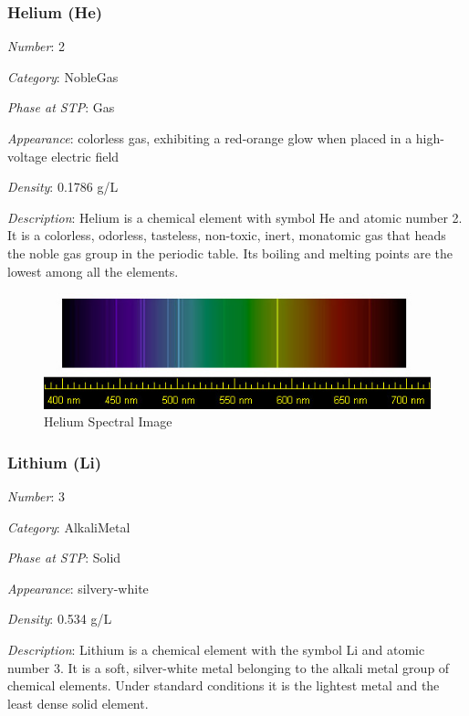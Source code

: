 \documentclass{article}
\begin{document}
\hypertarget{subsubsection::He}{}\subsubsection{Helium (He)}

\textit{Number}: 2

\textit{Category}: NobleGas

\textit{Phase at STP}: Gas

\textit{Appearance}: colorless gas, exhibiting a red-orange glow when placed in a high-voltage electric field

\textit{Density}: 0.1786 g/L

\textit{Description}: Helium is a chemical element with symbol He and atomic number 2. It is a colorless, odorless, tasteless, non-toxic, inert, monatomic gas that heads the noble gas group in the periodic table. Its boiling and melting points are the lowest among all the elements.

\immediate{}
\begin{figure}[!ht]
    \centering
    \includegraphics[width=12cm]{./resources/spectral_img/Helium_spectrum.jpg}
    \caption{Helium Spectral Image}
\end{figure}

\hypertarget{subsubsection::Li}{}\subsubsection{Lithium (Li)}

\textit{Number}: 3

\textit{Category}: AlkaliMetal

\textit{Phase at STP}: Solid

\textit{Appearance}: silvery-white

\textit{Density}: 0.534 g/L

\textit{Description}: Lithium is a chemical element with the symbol Li and atomic number 3. It is a soft, silver-white metal belonging to the alkali metal group of chemical elements. Under standard conditions it is the lightest metal and the least dense solid element.
\end{document}
